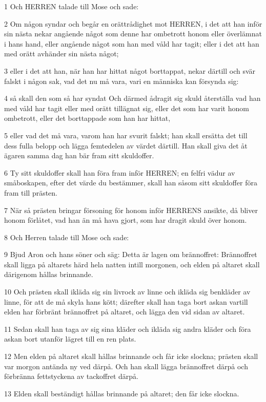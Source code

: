 \par 1 Och HERREN talade till Mose och sade:
\par 2 Om någon syndar och begår en orättrådighet mot HERREN, i det att han inför sin nästa nekar angående något som denne har ombetrott honom eller överlämnat i hans hand, eller angående något som han med våld har tagit; eller i det att han med orätt avhänder sin nästa något;
\par 3 eller i det att han, när han har hittat något borttappat, nekar därtill och svär falskt i någon sak, vad det nu må vara, vari en människa kan försynda sig:
\par 4 så skall den som så har syndat Och därmed ådragit sig skuld återställa vad han med våld har tagit eller med orätt tillägnat sig, eller det som har varit honom ombetrott, eller det borttappade som han har hittat,
\par 5 eller vad det må vara, varom han har svurit falskt; han skall ersätta det till dess fulla belopp och lägga femtedelen av värdet därtill. Han skall giva det åt ägaren samma dag han bär fram sitt skuldoffer.
\par 6 Ty sitt skuldoffer skall han föra fram inför HERREN; en felfri vädur av småboskapen, efter det värde du bestämmer, skall han såsom sitt skuldoffer föra fram till prästen.
\par 7 När så prästen bringar försoning för honom inför HERRENS ansikte, då bliver honom förlåtet, vad han än må hava gjort, som har dragit skuld över honom.
\par 8 Och Herren talade till Mose och sade:
\par 9 Bjud Aron och hans söner och säg: Detta är lagen om brännoffret: Brännoffret skall ligga på altarets härd hela natten intill morgonen, och elden på altaret skall därigenom hållas brinnande.
\par 10 Och prästen skall ikläda sig sin livrock av linne och ikläda sig benkläder av linne, för att de må skyla hans kött; därefter skall han taga bort askan vartill elden har förbränt brännoffret på altaret, och lägga den vid sidan av altaret.
\par 11 Sedan skall han taga av sig sina kläder och ikläda sig andra kläder och föra askan bort utanför lägret till en ren plats.
\par 12 Men elden på altaret skall hållas brinnande och får icke slockna; prästen skall var morgon antända ny ved därpå. Och han skall lägga brännoffret därpå och förbränna fettstyckena av tackoffret därpå.
\par 13 Elden skall beständigt hållas brinnande på altaret; den får icke slockna.
